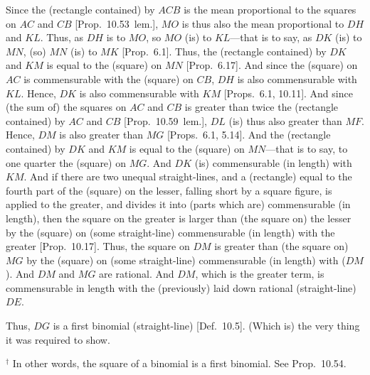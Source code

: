 \begin{Parallel}{}{}
{Since the (rectangle contained) by $ACB$ is the mean proportional to
 the squares on $AC$ and $CB$ [Prop.~10.53~lem.], $MO$ is thus also the
mean proportional to   $DH$ and $KL$. Thus,
as $DH$ is to $MO$, so $MO$ (is) to $KL$---that is to say, as $DK$
(is) to $MN$, (so) $MN$ (is) to $MK$ [Prop.~6.1].
Thus, the (rectangle contained) by $DK$ and $KM$ is equal
to the (square) on $MN$ [Prop.~6.17]. And since
the (square) on $AC$ is commensurable with the (square) on $CB$,
$DH$ is also commensurable with $KL$. Hence, $DK$
is also commensurable with $KM$ [Props.~6.1, 10.11].
And since (the sum of) the squares on $AC$ and $CB$ is greater
than twice the (rectangle contained) by $AC$ and $CB$ [Prop.~10.59~lem.], $DL$ (is) thus also
greater than $MF$. Hence, $DM$ is also greater than $MG$
[Props.~6.1, 5.14]. And
the (rectangle contained) by $DK$ and $KM$ is equal to
the (square) on $MN$---that is to say, to one quarter the (square) on $MG$.
And $DK$ (is) commensurable (in length) with $KM$. And if there are
two unequal straight-lines, and a (rectangle) equal to the fourth part
of the (square) on the lesser, falling short by a square figure, is applied to
the greater, and divides it into (parts which are) commensurable (in length),
then the square on the greater is larger than (the square on) the lesser by
the (square) on (some straight-line) commensurable (in length) with the greater [Prop.~10.17]. Thus,  the square on $DM$
is greater than (the square on) $MG$ by the (square) on (some straight-line)
commensurable (in length) with ($DM$). And $DM$ and $MG$ are rational. And
$DM$, which is the greater term, is commensurable in length with the (previously) laid down rational (straight-line) $DE$.

Thus, $DG$ is a first binomial (straight-line) [Def.~10.5]. (Which is) the very thing it was required to show.}
\end{Parallel}
{\footnotesize\noindent$^\dag$ In other words, the square of a binomial  is a
first binomial. See Prop.~10.54.}

